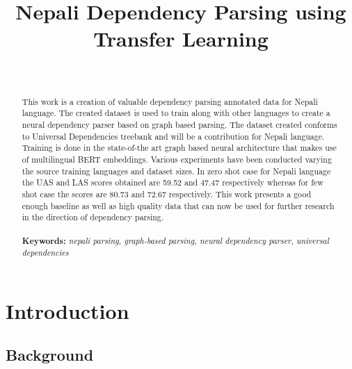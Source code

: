\title{Nepali Dependency Parsing using Transfer Learning}

\author{
\\
}

\maketitle


\begin{abstract}
This work is a creation of valuable dependency parsing annotated data for
Nepali language. The created dataset is used to train along with other
languages to create a neural dependency parser based on graph based parsing.
The dataset created conforms to Universal Dependencies treebank and
will be a contribution for Nepali language. Training is done in the
state-of-the art graph based neural architecture that makes use of
multilingual BERT embeddings. Various experiments have been conducted
varying the source training languages and dataset sizes. In zero shot
case for Nepali language the UAS and LAS scores obtained are 59.52 and
47.47 respectively whereas for few shot case the scores are 80.73 and
72.67 respectively. This work presents a good enough baseline as well
as high quality data that can now be used for further research in the
direction of dependency parsing.
\\~\\
\textbf{Keywords: }\textit{nepali parsing, graph-based parsing, neural dependency parser, universal dependencies}
\end{abstract}

\section{Introduction}

\subsection{Background}

